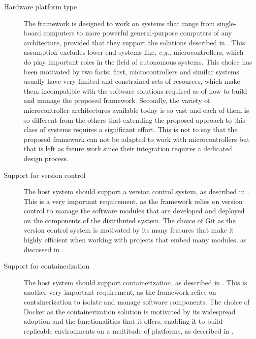 \begin{description}
  \item[Hardware platform type] The framework is designed to work on systems that range from single-board computers to more powerful general-purpose computers of any architecture, provided that they support the solutions described in . This assumption excludes lower-end systems like, \emph{e.g.}, microcontrollers, which do play important roles in the field of autonomous systems. This choice has been motivated by two facts: first, microcontrollers and similar systems usually have very limited and constrained sets of resources, which make them incompatible with the software solutions required as of now to build and manage the proposed framework. Secondly, the variety of microcontroller architectures available today is so vast and each of them is so different from the others that extending the proposed approach to this class of systems requires a significant effort. This is not to say that the proposed framework can not be adapted to work with microcontrollers but that is left as future work since their integration requires a dedicated design process.
  \item[Support for version control] The host system should support a version control system, as described in . This is a very important requirement, as the framework relies on version control to manage the software modules that are developed and deployed on the components of the distributed system. The choice of Git as the version control system is motivated by its many features that make it highly efficient when working with projects that embed many modules, as discussed in .
  \item[Support for containerization] The host system should support containerization, as described in . This is another very important requirement, as the framework relies on containerization to isolate and manage software components. The choice of Docker as the containerization solution is motivated by its widespread adoption and the functionalities that it offers, enabling it to build replicable environments on a multitude of platforms, as described in .

\end{description}
